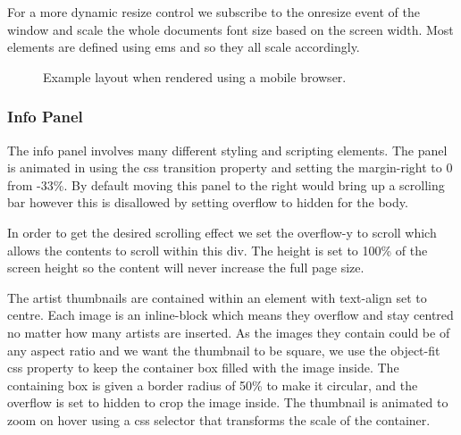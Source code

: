 \documentclass[10pt]{article}
\begin{document}
                For a more dynamic resize control we subscribe to the onresize event of the window and scale the whole documents font size based on the screen width. Most elements are defined using ems and so they all scale accordingly.
                \begin{figure}[!ht]
                  \centering
                  \caption{Example layout when rendered using a mobile browser.}
                \end{figure}

            \subsubsection{Info Panel}
                The info panel involves many different styling and scripting elements. The panel is animated in using the css transition property and setting the margin-right to 0 from -33\%. By default moving this panel to the right would bring up a scrolling bar however this is disallowed by setting overflow to hidden for the body.

                In order to get the desired scrolling effect we set the overflow-y to scroll which allows the contents to scroll within this div. The height is set to 100\% of the screen height so the content will never increase the full page size.

                The artist thumbnails are contained within an element with text-align set to centre. Each image is an inline-block which means they overflow and stay centred no matter how many artists are inserted. As the images they contain could be of any aspect ratio and we want the thumbnail to be square, we use the object-fit css property to keep the container box filled with the image inside. The containing box is given a border radius of 50\% to make it circular, and the overflow is set to hidden to crop the image inside. The thumbnail is animated to zoom on hover using a css selector that transforms the scale of the container.
\end{document}
